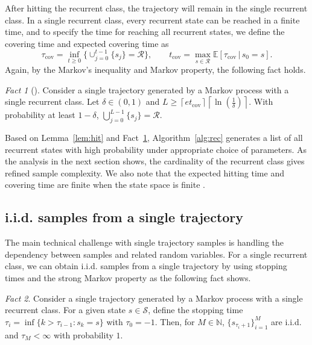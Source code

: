 \documentclass{article}
\theoremstyle{definition}
\theoremstyle{remark}
\newtheorem{fact}{Fact}
\newcommand{\expec}{\mathbb{E}}
\newcommand{\cS}{\mathcal{S}}
\newcommand{\cR}{\mathcal{R}}
\begin{document}
After hitting the recurrent class, the trajectory will remain in the single recurrent class. In a single recurrent class, every recurrent state can be reached in a finite time, and to specify the time for reaching all recurrent states, we define the covering time and expected covering time as
\[
\tau_{\mathrm{cov}}=\inf_{t\ge 0}\{ \cup^{t-1}_{j=0}\{s_j\}=\mathcal{R} \},
\qquad
t_{\mathrm{cov}}=\max_{s\in \cR} \expec [\tau_{\mathrm{cov}} \,|\, s_0=s].
\]
Again, by the Markov's inequality and Markov property, the following fact holds.
\begin{fact}[\cite
{chen2022learning,lee2025multi}]\label{fact:cov}
Consider a single trajectory generated by a Markov process with a single recurrent class. Let $ \delta \in (0,1)
$ and $L \ge \left\lceil e t_{\mathrm{cov}}\right\rceil  \left\lceil\ln \!\left(\frac{1}{\delta}\right)\right\rceil$. With probability at least $1-\delta$, $
\bigcup^{L-1}_{j=0}\{s_j\} = \mathcal{R}.
$
\end{fact}

Based on Lemma~\ref{lem:hit} and Fact~\ref{fact:cov}, Algorithm~\ref{alg:rec} generates a list of all recurrent states with high probability under appropriate choice of parameters. As the analysis in the next section shows, the cardinality of the recurrent class gives refined sample complexity. We also note that the expected hitting time and covering time are finite when the state space is finite \citep{lee2025policy, levin2017Markov}.

\subsection{i.i.d. samples from a single trajectory}

The main technical challenge with single trajectory samples is handling the dependency between samples and related random variables. For a single recurrent class, we can obtain i.i.d. samples from a single trajectory by using stopping times and the strong Markov property as the following fact shows. 


\begin{fact}\label{fact:iid}
 Consider a single trajectory generated by a Markov process with a single recurrent class. For a given state $s\in \cS$, define the stopping time $\tau_i = \inf \{k > \tau_{i-1} : s_{k}=s\}$
with $\tau_0=-1$. Then, for $M \in \mathbb{N}$, $\{s_{\tau_i+1}\}^M_{i=1}$ are i.i.d. and $\tau_M < \infty$ with probability $1$.
\end{fact}
\end{document}
